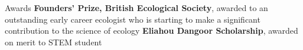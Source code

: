 \begin{rubric}{Awards}
\entry*[2023] \textbf{Founders' Prize, British Ecological Society}, awarded to an outstanding early career ecologist who is starting to make a significant contribution to the science of ecology
\entry*[2010] \textbf{Eliahou Dangoor Scholarship}, awarded on merit to STEM student
\end{rubric}